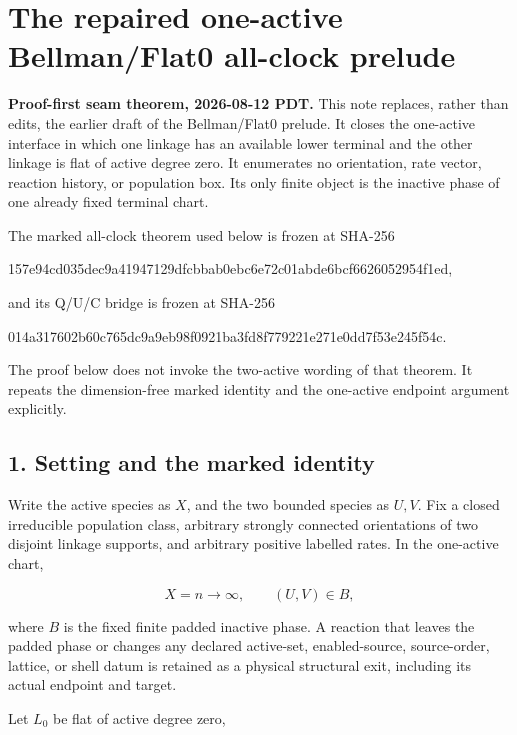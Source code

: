 \section{The repaired one-active Bellman/Flat0 all-clock
prelude}

\textbf{Proof-first seam theorem, 2026-08-12 PDT.} This note replaces,
rather than edits, the earlier draft of the Bellman/Flat0 prelude. It
closes the one-active interface in which one linkage has an available
lower terminal and the other linkage is flat of active degree zero. It
enumerates no orientation, rate vector, reaction history, or population
box. Its only finite object is the inactive phase of one already fixed
terminal chart.

The marked all-clock theorem used below is frozen at SHA-256

\begin{CodeBlock}
157e94cd035dec9a41947129dfcbbab0ebc6e72c01abde6bcf6626052954f1ed,
\end{CodeBlock}

and its Q/U/C bridge is frozen at SHA-256

\begin{CodeBlock}
014a317602b60c765dc9a9eb98f0921ba3fd8f779221e271e0dd7f53e245f54c.
\end{CodeBlock}

The proof below does not invoke the two-active wording of that theorem.
It repeats the dimension-free marked identity and the one-active
endpoint argument explicitly.

\subsection{1. Setting and the marked
identity}

Write the active species as \(X\), and the two bounded species as
\(U,V\). Fix a closed irreducible population class, arbitrary strongly
connected orientations of two disjoint linkage supports, and arbitrary
positive labelled rates. In the one-active chart,

\[
             X=n\longrightarrow\infty,\qquad (U,V)\in B,       \tag{1.1}
\]

where \(B\) is the fixed finite padded inactive phase. A reaction that
leaves the padded phase or changes any declared active-set,
enabled-source, source-order, lattice, or shell datum is retained as a
physical structural exit, including its actual endpoint and target.

Let \(L_0\) be flat of active degree zero,

